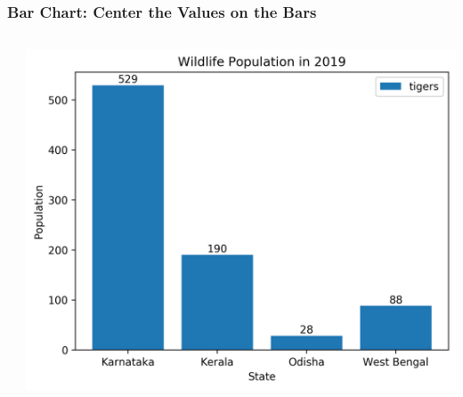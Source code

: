 \documentclass[xcolor={svgnames}]{beamer}
\newcommand{\pyfile}[2][]{}
\begin{document}
\begin{frame}[t,fragile]
    \frametitle{Bar Chart: Center the Values on the Bars}
    \vspace{-2mm}
    \begin{columns}[T]
        \begin{column}{0.54\textwidth}
            \pyfile[style=footnotesize]{examples/18-bar-values-aligned.py}
        \end{column}
        \begin{column}{0.46\textwidth}
            \includegraphics[width=\textwidth]{img/18-bar-values-aligned.png}
        \end{column}
    \end{columns}
\end{frame}
\end{document}
